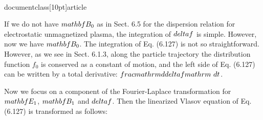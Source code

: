 \\documentclass[10pt]{article}
\begin{document}
{{{{If we do not have $\\mathbf{B}_{0}$ as in Sect. 6.5 for the dispersion relation for electrostatic unmagnetized plasma, the integration of $\\delta f$ is simple. However, now we have $\\mathbf{B}_{0}$. The integration of Eq. (6.127) is not so straightforward. However, as we see in Sect. 6.1.3, along the particle trajectory the distribution function $f_{0}$ is conserved as a constant of motion, and the left side of Eq. (6.127) can be written by a total derivative: $\\frac{\\mathrm{d} \\delta f}{\\mathrm{~d} t}$.

Now we focus on a component of the Fourier-Laplace transformation for $\\mathbf{E}_{1}$, $\\mathbf{B}_{1}$ and $\\delta f$. Then the linearized Vlasov equation of Eq. (6.127) is transformed as follows:


}}}}
\end{document}

